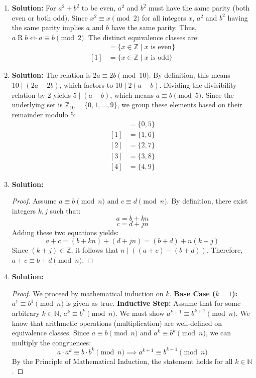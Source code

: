 \documentclass[11pt, a4paper]{article}
\theoremstyle{definition}
\theoremstyle{remark}
\newcommand{\N}{\mathbb{N}}
\newcommand{\Z}{\mathbb{Z}}
\begin{document}
\begin{enumerate}[label=\textbf{\arabic*.}]
    \item \textbf{Solution:}
    For $a^2 + b^2$ to be even, $a^2$ and $b^2$ must have the same parity (both even or both odd). Since $x^2 \equiv x \pmod{2}$ for all integers $x$, $a^2$ and $b^2$ having the same parity implies $a$ and $b$ have the same parity. Thus, $a \mathrel{R} b \iff a \equiv b \pmod{2}$. The distinct equivalence classes are:
    \begin{align*}
        [0] &= \{x \in \Z \mid x \text{ is even}\} \\
        [1] &= \{x \in \Z \mid x \text{ is odd}\}
    \end{align*}

    \item \textbf{Solution:}
    The relation is $2a \equiv 2b \pmod{10}$. By definition, this means $10 \mid (2a - 2b)$, which factors to $10 \mid 2(a - b)$. Dividing the divisibility relation by 2 yields $5 \mid (a - b)$, which means $a \equiv b \pmod{5}$. 
    Since the underlying set is $\Z_{10} = \{0, 1, \dots, 9\}$, we group these elements based on their remainder modulo 5:
    \begin{align*}
        [0] &= \{0, 5\} \\
        [1] &= \{1, 6\} \\
        [2] &= \{2, 7\} \\
        [3] &= \{3, 8\} \\
        [4] &= \{4, 9\}
    \end{align*}

    \item \textbf{Solution:}
    \begin{proof}
    Assume $a \equiv b \pmod{n}$ and $c \equiv d \pmod{n}$. By definition, there exist integers $k, j$ such that:
    \[ a = b + kn \]
    \[ c = d + jn \]
    Adding these two equations yields:
    \[ a + c = (b + kn) + (d + jn) = (b + d) + n(k + j) \]
    Since $(k + j) \in \Z$, it follows that $n \mid ((a + c) - (b + d))$. Therefore, $a + c \equiv b + d \pmod{n}$.
    \end{proof}

    \item \textbf{Solution:}
    \begin{proof}
    We proceed by mathematical induction on $k$.
    \textbf{Base Case ($k=1$):} $a^1 \equiv b^1 \pmod{n}$ is given as true.
    \textbf{Inductive Step:} Assume that for some arbitrary $k \in \N$, $a^k \equiv b^k \pmod{n}$. We must show $a^{k+1} \equiv b^{k+1} \pmod{n}$.
    We know that arithmetic operations (multiplication) are well-defined on equivalence classes. Since $a \equiv b \pmod{n}$ and $a^k \equiv b^k \pmod{n}$, we can multiply the congruences:
    \[ a \cdot a^k \equiv b \cdot b^k \pmod{n} \implies a^{k+1} \equiv b^{k+1} \pmod{n} \]
    By the Principle of Mathematical Induction, the statement holds for all $k \in \N$.
    \end{proof}


\end{enumerate}
\end{document}
